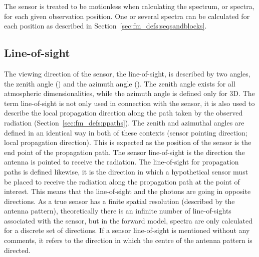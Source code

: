 The sensor is treated to be motionless when calculating the spectrum,
or spectra, for each given observation position. One or several
spectra can be calculated for each position as described in
Section~\ref{sec:fm_defs:seqsandblocks}.


\subsection{Line-of-sight}
\label{sec:fm_defs:los}

The viewing direction of the sensor, the line-of-sight, is described
by two angles, the zenith angle (\ZntAng) and the azimuth angle
(\AzmAng). The zenith angle exists for all atmospheric
dimensionalities, while the azimuth angle is defined only for 3D.
The term line-of-sight is not only used in connection with the sensor,
it is also used to describe the local propagation direction along the
path taken by the observed radiation
(Section~\ref{sec:fm_defs:ppaths}).  The zenith and azimuthal angles
are defined in an identical way in both of these contexts (sensor
pointing direction; local propagation direction). This is expected as
the position of the sensor is the end point of the propagation path.
The sensor line-of-sight is the direction the antenna is pointed to
receive the radiation. The line-of-sight for propagation paths is
defined likewise, it is the direction in which a hypothetical sensor
must be placed to receive the radiation along the propagation path at
the point of interest. This means that the line-of-sight and the
photons are going in opposite directions. As a true sensor has a
finite spatial resolution (described by the antenna pattern),
theoretically there is an infinite number of line-of-sights associated
with the sensor, but in the forward model, spectra are only calculated
for a discrete set of directions. If a sensor line-of-sight is
mentioned without any comments, it refers to the direction in which
the centre of the antenna pattern is directed.

